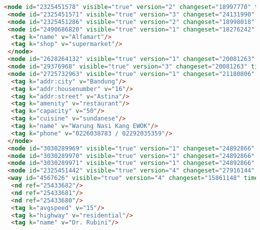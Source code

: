 \begin{lstlisting}[language=HTML,basicstyle=\tiny,caption=test.xml]
 <node id="2325451578" visible="true" version="2" changeset="18997770" timestamp="2013-11-19T17:08:36Z" user="ubanovic" uid="1784103" lat="-6.9048417" lon="107.6021410"/>
 <node id="2325451571" visible="true" version="3" changeset="24131990" timestamp="2014-07-14T03:03:32Z" user="brambanan" uid="2092576" lat="-6.9048702" lon="107.6013524"/>
 <node id="2325451286" visible="true" version="2" changeset="18998018" timestamp="2013-11-19T17:23:34Z" user="ubanovic" uid="1784103" lat="-6.9012529" lon="107.5974289"/>
 <node id="2490686820" visible="true" version="1" changeset="18276242" timestamp="2013-10-10T07:28:52Z" user="ArjanO" uid="38066" lat="-6.9071703" lon="107.5996685">
  <tag k="name" v="Alfamart"/>
  <tag k="shop" v="supermarket"/>
 </node>
 <node id="2628264132" visible="true" version="1" changeset="20081263" timestamp="2014-01-19T09:38:29Z" user="Irfan Muhammad" uid="646006" lat="-6.9116314" lon="107.5979581"/>
 <node id="29376968" visible="true" version="3" changeset="20081263" timestamp="2014-01-19T09:38:32Z" user="Irfan Muhammad" uid="646006" lat="-6.9117870" lon="107.5979651"/>
 <node id="2725732963" visible="true" version="1" changeset="21180806" timestamp="2014-03-18T19:57:06Z" user="Warung Nasi Kang EWOK" uid="1991592" lat="-6.9052749" lon="107.5961955">
  <tag k="addr:city" v="Bandung"/>
  <tag k="addr:housenumber" v="16"/>
  <tag k="addr:street" v="Astina"/>
  <tag k="amenity" v="restaurant"/>
  <tag k="capacity" v="50"/>
  <tag k="cuisine" v="sundanese"/>
  <tag k="name" v="Warung Nasi Kang EWOK"/>
  <tag k="phone" v="0226038783 / 02292035359"/>
 </node>
 <node id="3030289969" visible="true" version="1" changeset="24892866" timestamp="2014-08-20T18:40:31Z" user="albahrimaraxsa" uid="2162153" lat="-6.9069924" lon="107.5982831"/>
 <node id="3030289970" visible="true" version="1" changeset="24892866" timestamp="2014-08-20T18:40:31Z" user="albahrimaraxsa" uid="2162153" lat="-6.9067987" lon="107.5982587"/>
 <node id="3030289971" visible="true" version="1" changeset="24892866" timestamp="2014-08-20T18:40:31Z" user="albahrimaraxsa" uid="2162153" lat="-6.9066710" lon="107.5982569"/>
 <node id="2325451442" visible="true" version="4" changeset="27916144" timestamp="2015-01-04T18:06:33Z" user="isonpurba" uid="2552445" lat="-6.9045011" lon="107.6024922"/>
 <way id="4567626" visible="true" version="4" changeset="15861148" timestamp="2013-04-25T13:56:12Z" user="mrdoggie94" uid="1331966">
  <nd ref="25433682"/>
  <nd ref="25433681"/>
  <nd ref="25433680"/>
  <tag k="avgspeed" v="15"/>
  <tag k="highway" v="residential"/>
  <tag k="name" v="Dr. Rubini"/>

\end{lstlisting}
